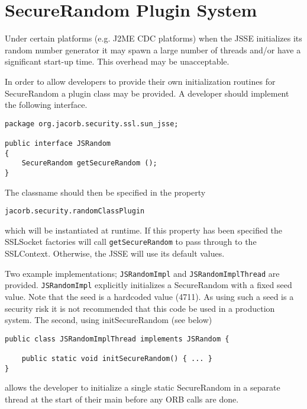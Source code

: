 \section{SecureRandom Plugin System}
\label{secureRandomPlugin}
Under certain platforms (e.g. J2ME CDC platforms) when the JSSE
initializes its random number generator it may spawn a large number
of threads and/or have a significant start-up time. This overhead may
be unacceptable.

In order to allow developers to provide their own initialization
routines for SecureRandom a plugin class may be provided. A developer
should implement the following interface.

\begin{small}
\begin{verbatim}
package org.jacorb.security.ssl.sun_jsse;

public interface JSRandom
{
    SecureRandom getSecureRandom ();
}
\end{verbatim}
\end{small}

The classname should then be specified in the property

\begin{verbatim}
jacorb.security.randomClassPlugin
\end{verbatim}
 which will be instantiated at runtime. If this property has been
specified the SSLSocket factories will call {\tt getSecureRandom}
to pass through to the SSLContext. Otherwise, the JSSE will use its
default values.

Two example implementations; {\tt JSRandomImpl} and {\tt JSRandomImplThread}
are provided. {\tt JSRandomImpl} explicitly initializes a SecureRandom with
a fixed seed value. Note that the seed is a hardcoded value (4711). As using
such a seed is a security risk it is not recommended that this code be used
in a production system. The second, using initSecureRandom (see below)

\begin{small}
\begin{verbatim}
public class JSRandomImplThread implements JSRandom {

    public static void initSecureRandom() { ... }
}
\end{verbatim}
\end{small}

allows the developer to initialize a single static SecureRandom
in a separate thread at the start of their main before any ORB
calls are done.

